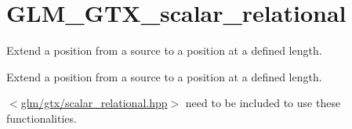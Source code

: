 \hypertarget{group__gtx__scalar__relational}{}\section{G\+L\+M\+\_\+\+G\+T\+X\+\_\+scalar\+\_\+relational}
\label{group__gtx__scalar__relational}


Extend a position from a source to a position at a defined length.  


Extend a position from a source to a position at a defined length. 

$<$\mbox{\hyperlink{scalar__relational_8hpp}{glm/gtx/scalar\+\_\+relational.\+hpp}}$>$ need to be included to use these functionalities. 